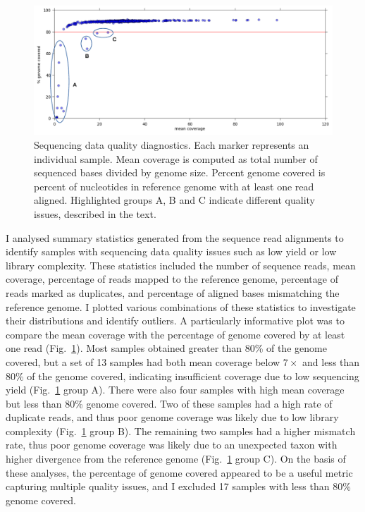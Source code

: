 \begin{refsection}
\begin{figure}[t!]
\centering
\includegraphics[width=\textwidth]{artwork/chapter3/coverage.pdf}
\caption{Sequencing data quality diagnostics.
%
Each marker represents an individual sample.
%
Mean coverage is computed as total number of sequenced bases divided by genome size.
%
Percent genome covered is percent of nucleotides in reference genome with at least one read aligned.
%
Highlighted groups A, B and C indicate different quality issues, described in the text.
}
%
\label{fig:ch3-coverage}
\end{figure}


I analysed summary statistics generated from the sequence read alignments to identify samples with sequencing data quality issues such as low yield or low library complexity.
%
These statistics included the number of sequence reads, mean coverage, percentage of reads mapped to the reference genome, percentage of reads marked as duplicates, and percentage of aligned bases mismatching the reference genome.
%
I plotted various combinations of these statistics to investigate their distributions and identify outliers.
%
A particularly informative plot was to compare the mean coverage with the percentage of genome covered by at least one read (Fig.~\ref{fig:ch3-coverage}).
%
Most samples obtained greater than 80\% of the genome covered, but a set of 13 samples had both mean coverage below $7\times$ and less than 80\% of the genome covered, indicating insufficient coverage due to low sequencing yield (Fig.~\ref{fig:ch3-coverage} group A).
%
There were also four samples with high mean coverage but less than 80\% genome covered.
%
Two of these samples had a high rate of duplicate reads, and thus poor genome coverage was likely due to low library complexity (Fig.~\ref{fig:ch3-coverage} group B).
%
The remaining two samples had a higher mismatch rate, thus poor genome coverage was likely due to an unexpected taxon with higher divergence from the reference genome (Fig.~\ref{fig:ch3-coverage} group C).
%
On the basis of these analyses, the percentage of genome covered appeared to be a useful metric capturing multiple quality issues, and I excluded 17 samples with less than 80\% genome covered.
%



\end{refsection}
